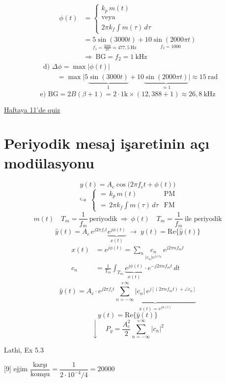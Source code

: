 \documentclass[11pt,a4paper]{article}
\begin{document}
\begin{align*}
\phi(t)&=\begin{cases}k_p\,m(t)\\ \text{veya}\\ 2\pi k_f\displaystyle\int m(\tau)\,d\tau\end{cases}\\
&=\underset{f_1=\frac{3000}{2\pi}\approx477{,}5\ \mathrm{Hz}}{5\sin(3000t)}+\underset{f_2=1000}{10\sin(2000\pi t)}\\
&\Rightarrow\ \mathrm{BG}=f_2=1\ \mathrm{kHz}
\end{align*}
\begin{align*}
&\text{d) }\Delta\phi=\max|\phi(t)|\\
&\qquad=\max\Big|5\underbrace{\sin(3000t)}_{1}+10\underbrace{\sin(2000\pi t)}_{\approx1}\Big|\approx15\ \mathrm{rad}
\end{align*}
\[ \text{e) }\mathrm{BG}=2B(\beta+1)=2\cdot1\mathrm{k}\times(12{,}388+1)\approx26{,}8\ \mathrm{kHz} \]

\underline{Haftaya 11'de quiz}

\section{Periyodik mesaj işaretinin açı modülasyonu}
\[ y(t)=A_c\cos\big(2\pi f_c t+\phi(t)\big) \]
\[ \hookrightarrow\ \begin{cases}{=}\,k_p\,m(t)&\text{PM}\\ {=}\,2\pi k_f\displaystyle\int m(\tau)\,d\tau&\text{FM}\end{cases} \]
\[ m(t)\quad T_m=\frac{1}{f_m}\ \text{periyodik}\ \Rightarrow\ \phi(t)\quad T_m=\frac{1}{f_m}\ \text{ile periyodik} \]
\[ \hat y(t)=A_c\,e^{j2\pi f_c t}\underbrace{e^{j\phi(t)}}_{x(t)}\;\to\;y(t)=\mathrm{Re}\{\hat y(t)\} \]
\begin{align*}
x(t)&=e^{j\phi(t)}=\sum_n \underset{|c_n|e^{j\angle c_n}}{c_n}\,e^{j2\pi nf_m t}\\
c_n&=\frac{1}{T_m}\int_{T_m}\underbrace{e^{j\phi(t)}}_{x(t)}\cdot e^{-j2\pi nf_m t}\,dt
\end{align*}
\[ \hat y(t)=A_c\cdot e^{j2\pi f_c t}\underbrace{\sum_{n=-\infty}^{+\infty}|c_n|\,e^{j[(2\pi nf_m t)+\angle c_n]}}_{x(t)=e^{j\phi(t)}} \]
\[ y(t)=\mathrm{Re}\{\hat y(t)\} \]
\[ \downarrow\quad P_y=\frac{A_c^2}{2}\sum_{n=-\infty}^{+\infty}|c_n|^2 \]

\begin{ornek}
Lathi, Ex 5.3
\end{ornek}
[9]
eğim $\dfrac{\text{karşı}}{\text{komşu}}=\dfrac{1}{2\cdot10^{-4}/4}=20000$
\end{document}
